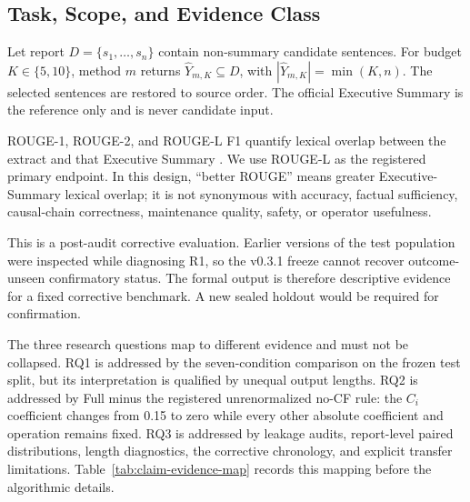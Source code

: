 \documentclass[applsci,article,submit,moreauthors]{Definitions/mdpi}
\begin{document}
\subsection{Task, Scope, and Evidence Class}

Let report $D=\{s_1,\ldots,s_n\}$ contain non-summary candidate sentences. For budget $K\in\{5,10\}$, method $m$ returns $\hat{Y}_{m,K}\subseteq D$, with $|\hat{Y}_{m,K}|=\min(K,n)$. The selected sentences are restored to source order. The official Executive Summary is the reference only and is never candidate input.

ROUGE-1, ROUGE-2, and ROUGE-L F1 quantify lexical overlap between the extract and that Executive Summary \cite{lin2004rouge}. We use ROUGE-L as the registered primary endpoint. In this design, ``better ROUGE'' means greater Executive-Summary lexical overlap; it is not synonymous with accuracy, factual sufficiency, causal-chain correctness, maintenance quality, safety, or operator usefulness.

This is a post-audit corrective evaluation. Earlier versions of the test population were inspected while diagnosing R1, so the v0.3.1 freeze cannot recover outcome-unseen confirmatory status. The formal output is therefore descriptive evidence for a fixed corrective benchmark. A new sealed holdout would be required for confirmation.

The three research questions map to different evidence and must not be collapsed. RQ1 is addressed by the seven-condition comparison on the frozen test split, but its interpretation is qualified by unequal output lengths. RQ2 is addressed by Full minus the registered unrenormalized no-CF rule: the $C_i$ coefficient changes from 0.15 to zero while every other absolute coefficient and operation remains fixed. RQ3 is addressed by leakage audits, report-level paired distributions, length diagnostics, the corrective chronology, and explicit transfer limitations. Table~\ref{tab:claim-evidence-map} records this mapping before the algorithmic details.
\end{document}
